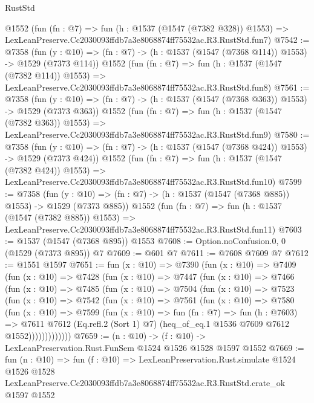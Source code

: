 \begin{lexlean}{RustStd}
\begin{coremodule}
    @1552
    (fun (fn : @7) =>
    fun (h : @1537 (@1547 (@7382 @328)) @1553) =>
    LexLeanPreserve.Cc2030093ffdb7a3e8068874ff75532ac.R3.RustStd.fun7)
@7542 := @7358
    (fun (y : @10) => (fn : @7) -> (h : @1537 (@1547 (@7368 @114)) @1553) -> @1529 (@7373 @114))
    @1552
    (fun (fn : @7) =>
    fun (h : @1537 (@1547 (@7382 @114)) @1553) =>
    LexLeanPreserve.Cc2030093ffdb7a3e8068874ff75532ac.R3.RustStd.fun8)
@7561 := @7358
    (fun (y : @10) => (fn : @7) -> (h : @1537 (@1547 (@7368 @363)) @1553) -> @1529 (@7373 @363))
    @1552
    (fun (fn : @7) =>
    fun (h : @1537 (@1547 (@7382 @363)) @1553) =>
    LexLeanPreserve.Cc2030093ffdb7a3e8068874ff75532ac.R3.RustStd.fun9)
@7580 := @7358
    (fun (y : @10) => (fn : @7) -> (h : @1537 (@1547 (@7368 @424)) @1553) -> @1529 (@7373 @424))
    @1552
    (fun (fn : @7) =>
    fun (h : @1537 (@1547 (@7382 @424)) @1553) =>
    LexLeanPreserve.Cc2030093ffdb7a3e8068874ff75532ac.R3.RustStd.fun10)
@7599 := @7358
    (fun (y : @10) => (fn : @7) -> (h : @1537 (@1547 (@7368 @885)) @1553) -> @1529 (@7373 @885))
    @1552
    (fun (fn : @7) =>
    fun (h : @1537 (@1547 (@7382 @885)) @1553) =>
    LexLeanPreserve.Cc2030093ffdb7a3e8068874ff75532ac.R3.RustStd.fun11)
@7603 := @1537 (@1547 (@7368 @895)) @1553
@7608 := Option.noConfusion.{0, 0} (@1529 (@7373 @895)) @7
@7609 := @601 @7
@7611 := @7608 @7609 @7
@7612 := @1551 @1597
@7651 := fun (x : @10) =>
  @7390
    (fun (x : @10) =>
    @7409
      (fun (x : @10) =>
      @7428
        (fun (x : @10) =>
        @7447
          (fun (x : @10) =>
          @7466
            (fun (x : @10) =>
            @7485
              (fun (x : @10) =>
              @7504
                (fun (x : @10) =>
                @7523
                  (fun (x : @10) =>
                  @7542
                    (fun (x : @10) =>
                    @7561
                      (fun (x : @10) =>
                      @7580
                        (fun (x : @10) =>
                        @7599
                          (fun (x : @10) =>
                          fun (fn : @7) =>
                          fun (h : @7603) =>
                          @7611
                            @7612
                            (Eq.refl.{2} (Sort 1) @7)
                            (heq_of_eq.{1} @1536 @7609 @7612 @1552)))))))))))))
@7659 := (n : @10) -> (f : @10) -> LexLeanPreservation.Rust.FunSem @1524 @1526 @1528 @1597 @1552
@7669 := fun (n : @10) =>
  fun (f : @10) =>
  LexLeanPreservation.Rust.simulate
    @1524
    @1526
    @1528
    LexLeanPreserve.Cc2030093ffdb7a3e8068874ff75532ac.R3.RustStd.crate_ok
    @1597
    @1552
\end{coremodule}
\end{lexlean}
